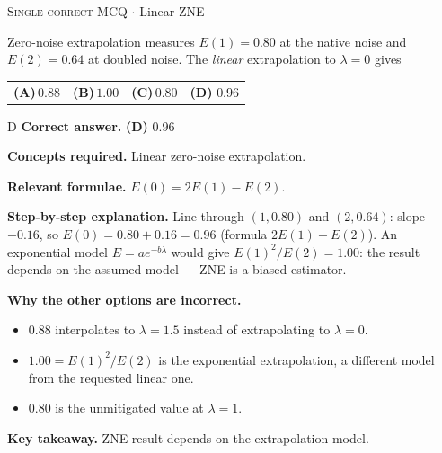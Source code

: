 \documentclass[11pt,a4paper]{article}
\newcommand{\optlabel}[1]{\textbf{(#1)}}
\newcommand{\correctlabel}[1]{\textcolor{okgreen}{\textbf{(#1)}\,\ding{51}}}
\newenvironment{qitem}[1]{\begin{list}{}{\setlength{\leftmargin}{3.3em}\setlength{\labelwidth}{3.1em}%
  \setlength{\labelsep}{0.2em}\setlength{\topsep}{3pt}\setlength{\parsep}{3pt}}\item[\textbf{Q.#1}\hfill]}{\end{list}}
\newcommand{\qsep}{\par\vspace{2pt}{\color{black!15}\hrule}\vspace{4pt}}
\newcommand{\qmeta}[2]{{\footnotesize\color{black!60}\textsc{#1} \;$\cdot$\; #2}\par}
\begin{document}
\begin{qitem}{63}
\qmeta{Single-correct MCQ}{Linear ZNE}
Zero-noise extrapolation measures $E(1) = 0.80$ at the native noise and $E(2) = 0.64$ at doubled noise. The \emph{linear} extrapolation to $\lambda = 0$ gives
\par\smallskip\noindent\begin{tabularx}{\linewidth}{@{}*{4}{L}@{}}
\optlabel{A}\,$0.88$ & \optlabel{B}\,$1.00$ & \optlabel{C}\,$0.80$ & \correctlabel{D}\,$0.96$
\end{tabularx}
\end{qitem}
\begin{solbox}{D}
\textbf{\color{brand}Correct answer.} \textcolor{okgreen}{\textbf{(D)}} $0.96$

\textbf{\color{brand}Concepts required.} Linear zero-noise extrapolation.

\textbf{\color{brand}Relevant formulae.} $E(0) = 2E(1) - E(2)$.

\textbf{\color{brand}Step-by-step explanation.} Line through $(1, 0.80)$ and $(2, 0.64)$: slope $-0.16$, so $E(0) = 0.80 + 0.16 = 0.96$ (formula $2E(1) - E(2)$).
An exponential model $E = ae^{-b\lambda}$ would give $E(1)^2/E(2) = 1.00$: the result depends on the assumed model --- ZNE is a biased estimator.

\textbf{\color{brand}Why the other options are incorrect.}
\begin{itemize}[leftmargin=2.4em, itemsep=1pt, topsep=2pt]
\item[\textbf{(A)}] $0.88$ interpolates to $\lambda = 1.5$ instead of extrapolating to $\lambda = 0$.
\item[\textbf{(B)}] $1.00 = E(1)^2/E(2)$ is the exponential extrapolation, a different model from the requested linear one.
\item[\textbf{(C)}] $0.80$ is the unmitigated value at $\lambda = 1$.
\end{itemize}
\textbf{\color{brand}Key takeaway.} ZNE result depends on the extrapolation model.
\end{solbox}
\qsep
\end{document}
